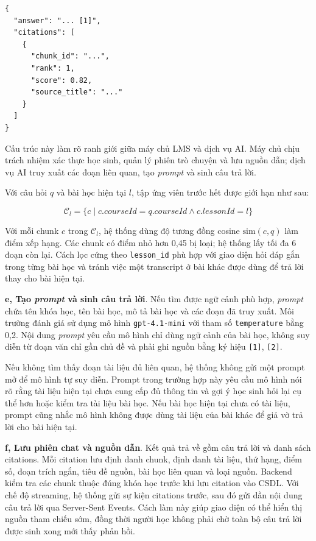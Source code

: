 \documentclass[../DoAn.tex]{subfiles}
\begin{document}
\begin{verbatim}
{
  "answer": "... [1]",
  "citations": [
    {
      "chunk_id": "...",
      "rank": 1,
      "score": 0.82,
      "source_title": "..."
    }
  ]
}
\end{verbatim}

Cấu trúc này làm rõ ranh giới giữa máy chủ LMS và dịch vụ AI. Máy chủ chịu trách nhiệm xác thực học sinh, quản lý phiên trò chuyện và lưu nguồn dẫn; dịch vụ AI truy xuất các đoạn liên quan, tạo \textit{prompt} và sinh câu trả lời.

Với câu hỏi \(q\) và bài học hiện tại \(l\), tập ứng viên trước hết được giới hạn như sau:

\begin{equation}
\mathcal{C}_{l} = \{c \mid c.courseId = q.courseId \land c.lessonId = l\}
\end{equation}

Với mỗi chunk \(c\) trong \(\mathcal{C}_{l}\), hệ thống dùng độ tương đồng cosine \(\mathrm{sim}(c,q)\) làm điểm xếp hạng. Các chunk có điểm nhỏ hơn 0,45 bị loại; hệ thống lấy tối đa 6 đoạn còn lại. Cách lọc cứng theo \texttt{lesson\_id} phù hợp với giao diện hỏi đáp gắn trong từng bài học và tránh việc một transcript ở bài khác được dùng để trả lời thay cho bài hiện tại.

\textbf{e, Tạo \textit{prompt} và sinh câu trả lời}. Nếu tìm được ngữ cảnh phù hợp, \textit{prompt} chứa tên khóa học, tên bài học, mô tả bài học và các đoạn đã truy xuất. Môi trường đánh giá sử dụng mô hình \texttt{gpt-4.1-mini} với tham số \texttt{temperature} bằng 0,2. Nội dung \textit{prompt} yêu cầu mô hình chỉ dùng ngữ cảnh của bài học, không suy diễn từ đoạn văn chỉ gần chủ đề và phải ghi nguồn bằng ký hiệu \texttt{[1]}, \texttt{[2]}.

Nếu không tìm thấy đoạn tài liệu đủ liên quan, hệ thống không gửi một prompt mở để mô hình tự suy diễn. Prompt trong trường hợp này yêu cầu mô hình nói rõ rằng tài liệu hiện tại chưa cung cấp đủ thông tin và gợi ý học sinh hỏi lại cụ thể hơn hoặc kiểm tra tài liệu bài học. Nếu bài học hiện tại chưa có tài liệu, prompt cũng nhắc mô hình không được dùng tài liệu của bài khác để giả vờ trả lời cho bài hiện tại.

\textbf{f, Lưu phiên chat và nguồn dẫn}. Kết quả trả về gồm câu trả lời và danh sách citations. Mỗi citation lưu định danh chunk, định danh tài liệu, thứ hạng, điểm số, đoạn trích ngắn, tiêu đề nguồn, bài học liên quan và loại nguồn. Backend kiểm tra các chunk thuộc đúng khóa học trước khi lưu citation vào CSDL. Với chế độ streaming, hệ thống gửi sự kiện citations trước, sau đó gửi dần nội dung câu trả lời qua Server-Sent Events. Cách làm này giúp giao diện có thể hiển thị nguồn tham chiếu sớm, đồng thời người học không phải chờ toàn bộ câu trả lời được sinh xong mới thấy phản hồi.
\end{document}
